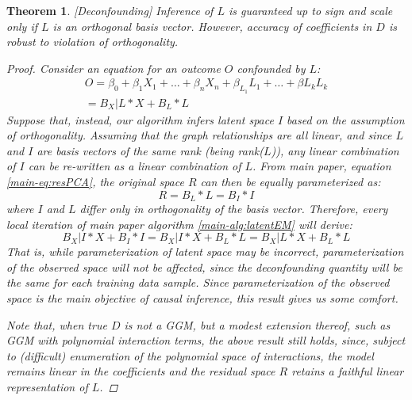 \documentclass[letterpaper]{article}
\newtheorem{theorem}{Theorem}
\begin{document}
\begin{theorem}
\label{thm:deconfounding}[Deconfounding]
Inference of $L$ is guaranteed up to sign and scale only if $L$ is an orthogonal basis vector.  However, accuracy of coefficients in $D$ is robust to violation of orthogonality.
\begin{proof}
Consider an equation for an outcome $O$ confounded by $L$:
\begin{equation}
\begin{split}
O = \beta_{0} + \beta_{1} X_1 + \ldots +\beta_{n} X_n + \beta_{L_1} L_1 + \ldots + \beta{L_k} L_k \\= B_X|L * X + B_L * L
\end{split}
\label{eq:confNonOrth}
\end{equation}
Suppose that, instead, our algorithm infers latent space $I$ based on the assumption of orthogonality.  Assuming that the graph relationships are all linear, and since $L$ and $I$ are basis vectors of the same rank (being rank($L$)), any linear combination of $I$ can be re-written as a linear combination of $L$.  From main paper, equation \ref{main-eq:resPCA}, the original space $R$ can then be equally parameterized as:
\begin{equation}
R = B_L * L = B_I * I
\end{equation}
where $I$ and $L$ differ only in orthogonality of the basis vector.   Therefore, every local iteration of main paper algorithm \ref{main-alg:latentEM} will derive:
\begin{equation}
B_X|I * X + B_I * I = B_X|I * X  + B_L * L = B_X|L * X + B_L * L
\end{equation}
That is, while parameterization of latent space may be incorrect, parameterization of the observed space will not be affected, since the deconfounding quantity will be the same for each training data sample.  Since parameterization of the observed space is the main objective of causal inference, this result gives us some comfort.  

Note that, when true $D$ is not a GGM, but a modest extension thereof, such as GGM with polynomial interaction terms, the above result still holds, since, subject to (difficult) enumeration of the polynomial space of interactions, the model remains linear in the coefficients and the residual space $R$ retains a faithful linear representation of $L$.
\end{proof}
\end{theorem}
\end{document}
